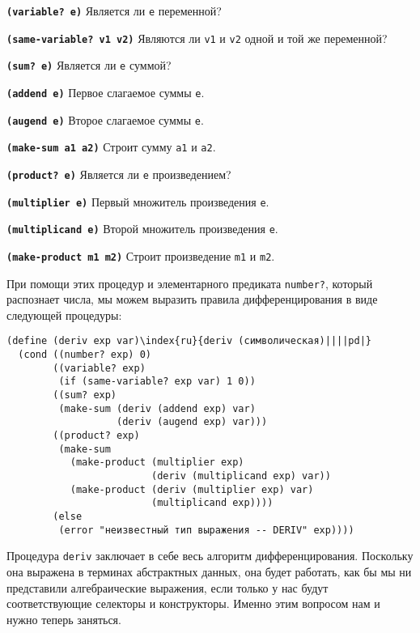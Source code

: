 \begin{plainlist}

\item
{\bf {\tt (variable? e)}} 
Является ли {\tt e} переменной?
\item
{\bf {\tt (same-variable? v1 v2)}} 
Являются ли {\tt v1} и {\tt v2}
одной и той же переменной?
\item
{\bf {\tt (sum? e)}} 
Является ли {\tt e} суммой?
\item
{\bf {\tt (addend e)}} 
Первое слагаемое суммы {\tt e}.
\item
{\bf {\tt (augend e)}} 
Второе слагаемое суммы {\tt e}.
\item
{\bf {\tt (make-sum a1 a2)}} 
Строит сумму {\tt a1} и {\tt a2}.
\item
{\bf {\tt (product? e)}} 
Является ли {\tt e} произведением?
\item
{\bf {\tt (multiplier e)}} Первый множитель произведения {\tt e}.
\item
{\bf {\tt (multiplicand e)}} Второй множитель произведения {\tt e}.
\item
{\bf {\tt (make-product m1 m2)}} 
Строит произведение {\tt m1} и {\tt m2}.
\end{plainlist}
При помощи этих процедур и элементарного предиката
{\tt number?}, 
который распознает числа, мы можем выразить
правила дифференцирования в виде следующей процедуры:

\begin{Verbatim}[fontsize=\small]
(define (deriv exp var)\index{ru}{deriv (символическая)||||pd|}
  (cond ((number? exp) 0)
        ((variable? exp)
         (if (same-variable? exp var) 1 0))
        ((sum? exp)
         (make-sum (deriv (addend exp) var)
                   (deriv (augend exp) var)))
        ((product? exp)
         (make-sum
           (make-product (multiplier exp)
                         (deriv (multiplicand exp) var))
           (make-product (deriv (multiplier exp) var)
                         (multiplicand exp))))
        (else
         (error "неизвестный тип выражения -- DERIV" exp))))
\end{Verbatim}
Процедура {\tt deriv} заключает в себе весь алгоритм
дифференцирования.  Поскольку она выражена в терминах
абстрактных данных, она будет работать, как бы мы ни представили
алгебраические выражения, если только у нас будут соответствующие
селекторы и конструкторы.  Именно этим вопросом нам и нужно теперь
заняться.

